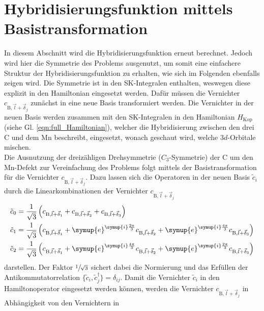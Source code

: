 \section{Hybridisierungsfunktion mittels Basistransformation}
In diesem Abschnitt wird die Hybridisierungsfunktion erneut berechnet. 
Jedoch wird hier die Symmetrie des Problems ausgenutzt, um somit eine einfachere Struktur der Hybridisierungsfunktion zu erhalten, wie sich im 
Folgenden ebenfalls zeigen wird.
Die Symmetrie ist in den SK-Integralen enthalten, weswegen diese explizit in den Hamiltonian eingesetzt werden.
Dafür müssen die Vernichter $c_{\text{B},\vec{l}+\vec{\delta}_j}$ zunächst in eine neue Basis transformiert werden.
Die Vernichter in der neuen Basis werden zusammen mit den SK-Integralen in den Hamiltonian $H_\text{Kop}$ (siehe Gl. \eqref{eqn:full_Hamiltonian}), welcher die Hybridisierung
zwischen den drei C und dem Mn beschreibt, eingesetzt,
wonach geschaut wird, welche $3d$-Orbitale mischen. \\
Die Ausnutzung der dreizähligen Drehsymmetrie ($C_3$-Symmetrie) der C um den Mn-Defekt zur Vereinfachung des Problems folgt mittels der Basistransformation für die Vernichter $c_{\text{B},\vec{l}+\vec{\delta}_j}$.
Dazu lassen sich die Operatoren in der neuen Basis $\tilde{c}_i$ durch die Linearkombinationen der Vernichter $c_{\text{B},\vec{l}+\vec{\delta}_j}$
\begin{equation}
    \begin{aligned}
    \tilde{c}_0 &= \frac{1}{\sqrt{3}}\left (c_{\text{B},\vec{l}+\vec{\delta}_1} + c_{\text{B},\vec{l}+\vec{\delta}_2} + c_{\text{B},\vec{l}+\vec{\delta}_3} \right ) \\
    \tilde{c}_1 &= \frac{1}{\sqrt{3}}\left (c_{\text{B},\vec{l}+\vec{\delta}_1}+ \symup{e}^{\symup{i}\frac{2\pi}{3}} c_{\text{B},\vec{l}+\vec{\delta}_2} + \symup{e}^{\symup{i}\frac{4\pi}{3}}c_{\text{B},\vec{l}+\vec{\delta}_3} \right ) \\
    \tilde{c}_2 &= \frac{1}{\sqrt{3}}\left (c_{\text{B},\vec{l}+\vec{\delta}_1} + \symup{e}^{\symup{i}\frac{4\pi}{3}} c_{\text{B},\vec{l}+\vec{\delta}_2} + \symup{e}^{\symup{i}\frac{2\pi}{3}}c_{\text{B},\vec{l}+\vec{\delta}_3} \right ) \label{eqn:sole} 
    \end{aligned}
\end{equation}
darstellen. 
Der Faktor $\sfrac{1}{\sqrt{3}}$ sichert dabei die Normierung und das Erfüllen der Antikommutatorrelation $\{\tilde{c}_i,\tilde{c}^\dagger_j\} = \delta_{ij}$.
Damit die Vernichter $\tilde{c}_i$ in den Hamiltonoperator eingesetzt werden können, werden die Vernichter $c_{\text{B},\vec{l}+\vec{\delta}_j}$ in Abhängigkeit von den Vernichtern in
